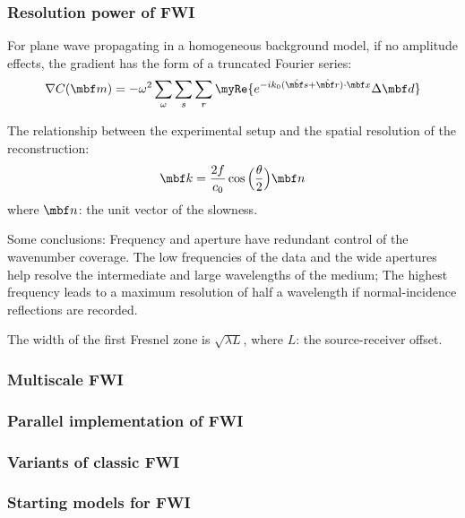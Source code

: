 \subsubsection{Resolution power of FWI}
For plane wave propagating in a homogeneous background model,
if no amplitude effects, the gradient has the form of
a truncated Fourier series:
\[ \nabla C(\mbf m) = -\omega^2\sum_\omega\sum_s\sum_r \myRe\{
  e^{-ik_0(\hat{\mbf s}+\hat{\mbf r})\cdot\mbf x} \Delta\mbf d\} \]

The relationship between the experimental setup and
the spatial resolution of the reconstruction:
\[ \mbf k=\frac{2f}{c_0}\cos\Big(\frac{\theta}{2}\Big)\mbf n \]
where $\mbf n$: the unit vector of the slowness.

Some conclusions:
Frequency and aperture have redundant control of the wavenumber coverage.
The low frequencies of the data and the wide apertures help resolve
the intermediate and large wavelengths of the medium;
The highest frequency leads to a maximum resolution of half a wavelength
if normal-incidence reflections are recorded.

The width of the first Fresnel zone is $\sqrt{\lambda L}$,
where $L$: the source-receiver offset.





























\subsubsection{Multiscale FWI}

\subsubsection{Parallel implementation of FWI}

\subsubsection{Variants of classic FWI}

\subsubsection{Starting models for FWI}




